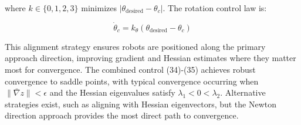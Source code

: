 \documentclass{article}
\begin{document}
where $k \in \{0,1,2,3\}$ minimizes $|\theta_{\text{desired}} - \theta_c|$. The rotation control law is:

\begin{equation}
\dot{\theta}_c = k_\theta(\theta_{\text{desired}} - \theta_c)
\end{equation}

This alignment strategy ensures robots are positioned along the primary approach direction, improving gradient and Hessian estimates where they matter most for convergence. The combined control (34)-(35) achieves robust convergence to saddle points, with typical convergence occurring when $\|\bar{\nabla}z\| < \epsilon$ and the Hessian eigenvalues satisfy $\lambda_1 < 0 < \lambda_2$. Alternative strategies exist, such as aligning with Hessian eigenvectors, but the Newton direction approach provides the most direct path to convergence.
\end{document}
